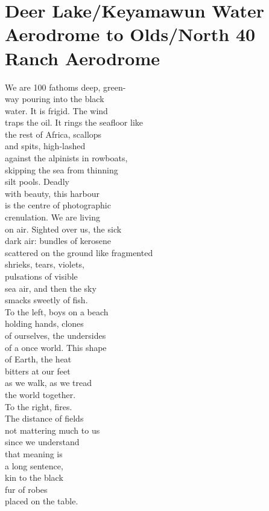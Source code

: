\documentclass[smalldemyvopaper,11pt,twoside,onecolumn,openright,extrafontsizes]{memoir}
\begin{document}
\chapter{Deer Lake/Keyamawun Water Aerodrome to Olds/North 40 Ranch Aerodrome}
We are 100 fathoms deep, green-
\\way pouring into the black
\\water. It is frigid. The wind
\\traps the oil. It rings the seafloor like
\\the rest of Africa, scallops
\\and spits, high-lashed
\\against the alpinists in rowboats,
\\skipping the sea from thinning
\\silt pools. Deadly
\\with beauty, this harbour
\\is the centre of photographic
\\crenulation. We are living
\\on air. Sighted over us, the sick
\\dark air: bundles of kerosene
\\scattered on the ground like fragmented
\\shrieks, tears, violets,
\\pulsations of visible
\\sea air, and then the sky
\\smacks sweetly of fish.
\\To the left, boys on a beach
\\holding hands, clones
\\of ourselves, the undersides
\\of a once world. This shape
\\of Earth, the heat
\\bitters at our feet
\\as we walk, as we tread
\\the world together.
\\To the right, fires.
\\The distance of fields
\\not mattering much to us
\\since we understand
\\that meaning is
\\a long sentence,
\\kin to the black
\\fur of robes
\\placed on the table.
\end{document}
